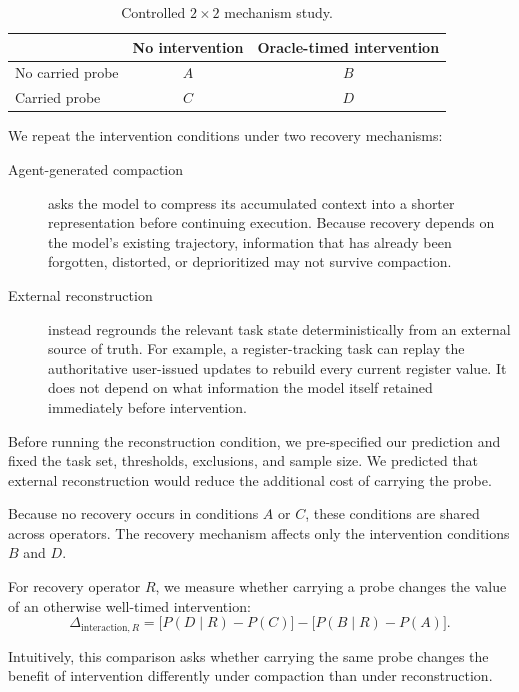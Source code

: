 \documentclass{article}
\begin{document}
\begin{table}[t]
  \caption{Controlled $2\times2$ mechanism study.}
  \label{tab:factorial-design}
  \centering
  \begin{tabular}{lcc}
    \toprule
      & No intervention & Oracle-timed intervention \\
    \midrule
    No carried probe & $A$ & $B$ \\
    Carried probe    & $C$ & $D$ \\
    \bottomrule
  \end{tabular}
\end{table}

We repeat the intervention conditions under two recovery mechanisms:
\begin{description}
  \item[Agent-generated compaction] asks the model to compress its accumulated context into a shorter representation before continuing execution. Because recovery depends on the model's existing trajectory, information that has already been forgotten, distorted, or deprioritized may not survive compaction.
  \item[External reconstruction] instead regrounds the relevant task state deterministically from an external source of truth. For example, a register-tracking task can replay the authoritative user-issued updates to rebuild every current register value. It does not depend on what information the model itself retained immediately before intervention.
\end{description}

Before running the reconstruction condition, we pre-specified our prediction and fixed the task set, thresholds, exclusions, and sample size. We predicted that external reconstruction would reduce the additional cost of carrying the probe.

Because no recovery occurs in conditions $A$ or $C$, these conditions are shared across operators. The recovery mechanism affects only the intervention conditions $B$ and $D$.

For recovery operator $R$, we measure whether carrying a probe changes the value of an otherwise well-timed intervention:
\begin{equation}
  \Delta_{\mathrm{interaction},R}
  = \bigl[P(D\mid R)-P(C)\bigr]
  - \bigl[P(B\mid R)-P(A)\bigr].
  \label{eq:interaction}
\end{equation}

Intuitively, this comparison asks whether carrying the same probe changes the benefit of intervention differently under compaction than under reconstruction.
\end{document}
